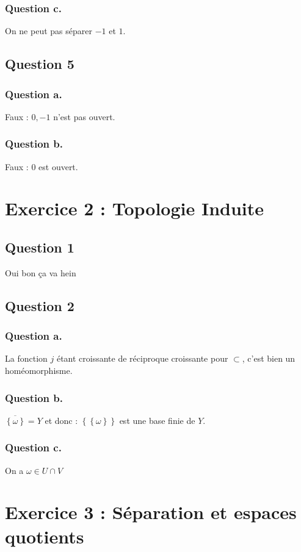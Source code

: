 \documentclass{cours}
\begin{document}
        \subsubsection{Question c.}
            On ne peut pas séparer $-1$ et $1$.
        
    \subsection{Question 5}
        \subsubsection{Question a.}
            Faux : ${0, -1}$ n'est pas ouvert. 
        \subsubsection{Question b.}
            Faux : ${0}$ est ouvert. 
    
\section{Exercice 2 : Topologie Induite}
    \subsection{Question 1}
        Oui bon ça va hein

    \subsection{Question 2}
        \subsubsection{Question a.}
            La fonction $j$ étant croissante de réciproque croissante pour $\subset$, c'est bien un homéomorphisme. 
        \subsubsection{Question b.}
            $\overline{\left\{\omega\right\}} = Y$ et donc : $\left\{\left\{\omega\right\}\right\}$ est une base finie de $Y$.
        \subsubsection{Question c.}
            On a $\omega \in U \cap V$

\section{Exercice 3 : Séparation et espaces quotients}
\end{document}
